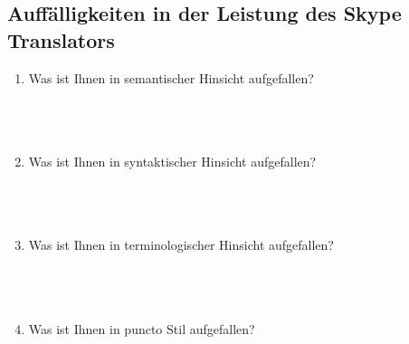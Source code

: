 
\subsection*{Auffälligkeiten in der Leistung des Skype Translators}


\begin{enumerate}[resume]
\item \label{App3:SemH}Was ist Ihnen in semantischer Hinsicht aufgefallen?\\
	   \underline{\hspace{7.5cm}}\\ 
       \underline{\hspace{7.5cm}}\\   
       \underline{\hspace{7.5cm}}\\   
       \underline{\hspace{7.5cm}} 

\item \label{App3:SynH}Was ist Ihnen in syntaktischer Hinsicht aufgefallen?\\
	   \underline{\hspace{7.5cm}}\\ 
       \underline{\hspace{7.5cm}}\\   
       \underline{\hspace{7.5cm}}\\   
       \underline{\hspace{7.5cm}} 


\item \label{App3:TerH}Was ist Ihnen in terminologischer Hinsicht aufgefallen?\\
	   \underline{\hspace{7.5cm}}\\ 
       \underline{\hspace{7.5cm}}\\   
       \underline{\hspace{7.5cm}}\\   
       \underline{\hspace{7.5cm}} 
       
\item \label{App3:Stil}Was ist Ihnen in puncto Stil aufgefallen?\\
	   \underline{\hspace{7.5cm}}\\ 
       \underline{\hspace{7.5cm}}\\   
       \underline{\hspace{7.5cm}}\\   
       \underline{\hspace{7.5cm}} 
       

\end{enumerate}
